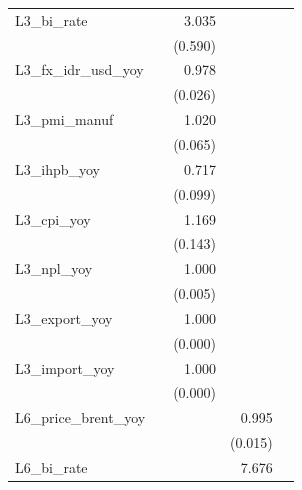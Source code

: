 {\begin{tabular}{l*{4}{D{.}{.}{-1}}}
\addlinespace
L3\_bi\_rate      &                  &    3.035\sym{***}&                  &                  \\
                &                  &  (0.590)         &                  &                  \\
\addlinespace
L3\_fx\_idr\_usd\_yoy&                  &    0.978         &                  &                  \\
                &                  &  (0.026)         &                  &                  \\
\addlinespace
L3\_pmi\_manuf    &                  &    1.020         &                  &                  \\
                &                  &  (0.065)         &                  &                  \\
\addlinespace
L3\_ihpb\_yoy     &                  &    0.717\sym{**} &                  &                  \\
                &                  &  (0.099)         &                  &                  \\
\addlinespace
L3\_cpi\_yoy      &                  &    1.169         &                  &                  \\
                &                  &  (0.143)         &                  &                  \\
\addlinespace
L3\_npl\_yoy      &                  &    1.000         &                  &                  \\
                &                  &  (0.005)         &                  &                  \\
\addlinespace
L3\_export\_yoy   &                  &    1.000         &                  &                  \\
                &                  &  (0.000)         &                  &                  \\
\addlinespace
L3\_import\_yoy   &                  &    1.000         &                  &                  \\
                &                  &  (0.000)         &                  &                  \\
\addlinespace
L6\_price\_brent\_yoy&                  &                  &    0.995         &                  \\
                &                  &                  &  (0.015)         &                  \\
\addlinespace
L6\_bi\_rate      &                  &                  &    7.676\sym{**} &                  \\

\end{tabular}}
